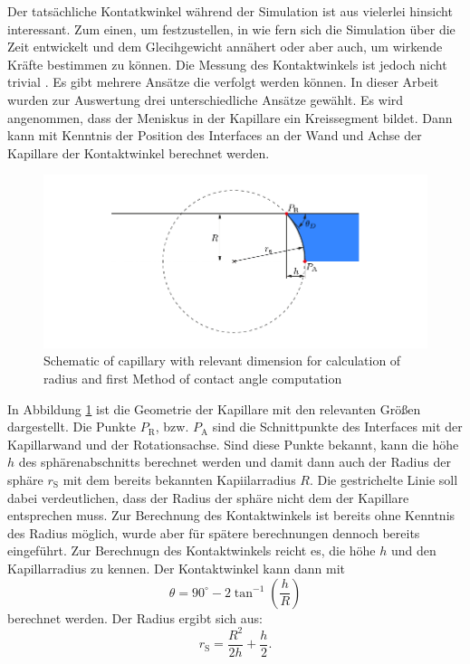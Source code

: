 Der tatsächliche Kontatkwinkel während der Simulation ist aus vielerlei hinsicht interessant. Zum einen, um festzustellen, in wie fern sich die Simulation über die Zeit entwickelt und dem Glecihgewicht annähert oder aber auch, um wirkende Kräfte bestimmen zu können. Die Messung des Kontaktwinkels ist jedoch nicht trivial \cite{carlson2011DissipationRapidDynamic}. Es gibt mehrere Ansätze die verfolgt werden können. In dieser Arbeit wurden zur Auswertung drei unterschiedliche Ansätze gewählt. Es wird angenommen, dass der Meniskus in der Kapillare ein Kreissegment bildet. Dann kann mit Kenntnis der Position des Interfaces an der Wand und Achse der Kapillare der Kontaktwinkel berechnet werden.
\begin{figure}[h]
    \centering
    \includegraphics[width=.95\textwidth]{Pictures/RadiusCalc.pdf}
    \caption{Schematic of capillary with relevant dimension for calculation of radius and first Method of contact angle computation}
    \label{fig: RadiusCalc}
\end{figure}
In Abbildung \ref*{fig: RadiusCalc} ist die Geometrie der Kapillare mit den relevanten Größen dargestellt. Die Punkte $P_{\mathrm{R}}$, bzw. $P_{\mathrm{A}}$ sind die Schnittpunkte des Interfaces mit der Kapillarwand und der Rotationsachse. Sind diese Punkte bekannt, kann die höhe $h$ des sphärenabschnitts berechnet werden und damit dann auch der Radius der sphäre $r_{\mathrm{S}}$ mit dem bereits bekannten Kapiilarradius $R$. Die gestrichelte Linie soll dabei verdeutlichen, dass der Radius der sphäre nicht dem der Kapillare entsprechen muss. Zur Berechnung des Kontaktwinkels ist bereits ohne Kenntnis des Radius möglich, wurde aber für spätere berechnungen dennoch bereits eingeführt. Zur Berechnugn des Kontaktwinkels reicht es, die höhe $h$ und den Kapillarradius  zu kennen. Der Kontaktwinkel kann dann mit 
\begin{equation}
    \theta = 90^{\circ}- 2\tan^{-1}\left(\frac{h}{R}\right) 
\end{equation}
berechnet werden. Der Radius ergibt sich aus:
\begin{equation}
    r_{\mathrm{S}} = \frac{R^2}{2h}+\frac{h}{2}.
\end{equation}  

